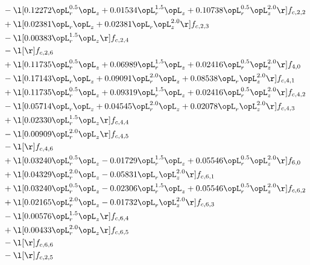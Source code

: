 \begin{alignat}{2}
& - \l[  0.12272 \opL_r^{0.5} \opL_z +  0.01534 \opL_r^{1.5} \opL_z +  0.10738 \opL_r^{0.5} \opL_z^{2.0}  \r] f_{c,2,2} \nonumber \\ 
& + \l[  0.02381 \opL_r \opL_z +  0.02381 \opL_r \opL_z^{2.0}  \r] f_{c,2,3} \nonumber \\ 
& - \l[  0.00383 \opL_r^{1.5} \opL_z  \r] f_{c,2,4} \nonumber \\ 
& - \l[  \r] f_{c,2,6} \nonumber \\ 
& + \l[  0.11735 \opL_r^{0.5} \opL_z +  0.06989 \opL_r^{1.5} \opL_z +  0.02416 \opL_r^{0.5} \opL_z^{2.0}  \r] f_{4,0} \nonumber \\ 
& - \l[  0.17143 \opL_r \opL_z +  0.09091 \opL_r^{2.0} \opL_z +  0.08538 \opL_r \opL_z^{2.0}  \r] f_{c,4,1} \nonumber \\ 
& + \l[  0.11735 \opL_r^{0.5} \opL_z +  0.09319 \opL_r^{1.5} \opL_z +  0.02416 \opL_r^{0.5} \opL_z^{2.0}  \r] f_{c,4,2} \nonumber \\ 
& - \l[  0.05714 \opL_r \opL_z +  0.04545 \opL_r^{2.0} \opL_z +  0.02078 \opL_r \opL_z^{2.0}  \r] f_{c,4,3} \nonumber \\ 
& + \l[  0.02330 \opL_r^{1.5} \opL_z  \r] f_{c,4,4} \nonumber \\ 
& - \l[  0.00909 \opL_r^{2.0} \opL_z  \r] f_{c,4,5} \nonumber \\ 
& - \l[  \r] f_{c,4,6} \nonumber \\ 
& + \l[  0.03240 \opL_r^{0.5} \opL_z   -0.01729 \opL_r^{1.5} \opL_z +  0.05546 \opL_r^{0.5} \opL_z^{2.0}  \r] f_{6,0} \nonumber \\ 
& + \l[  0.04329 \opL_r^{2.0} \opL_z   -0.05831 \opL_r \opL_z^{2.0}  \r] f_{c,6,1} \nonumber \\ 
& + \l[  0.03240 \opL_r^{0.5} \opL_z   -0.02306 \opL_r^{1.5} \opL_z +  0.05546 \opL_r^{0.5} \opL_z^{2.0}  \r] f_{c,6,2} \nonumber \\ 
& + \l[  0.02165 \opL_r^{2.0} \opL_z   -0.01732 \opL_r \opL_z^{2.0}  \r] f_{c,6,3} \nonumber \\ 
& - \l[  0.00576 \opL_r^{1.5} \opL_z  \r] f_{c,6,4} \nonumber \\ 
& + \l[  0.00433 \opL_r^{2.0} \opL_z  \r] f_{c,6,5} \nonumber \\ 
& - \l[  \r] f_{c,6,6} \nonumber \\ 
& - \l[  \r] f_{c,2,5} \nonumber \\ 
\end{alignat} 



